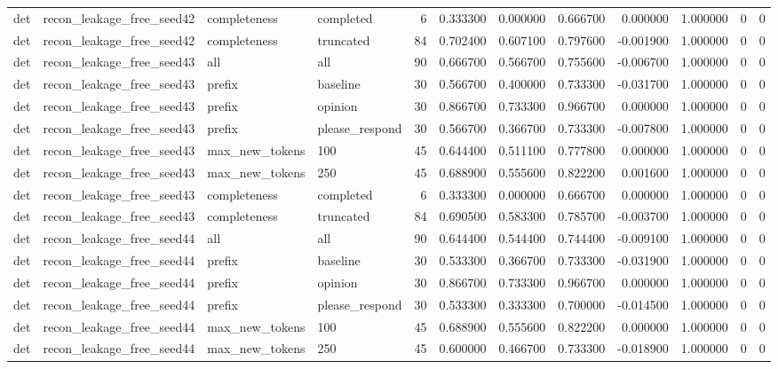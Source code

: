 \begin{tabular}{llllrrrrrrrr}
det & recon_leakage_free_seed42 & completeness & completed & 6 & 0.333300 & 0.000000 & 0.666700 & 0.000000 & 1.000000 & 0 & 0 \\
det & recon_leakage_free_seed42 & completeness & truncated & 84 & 0.702400 & 0.607100 & 0.797600 & -0.001900 & 1.000000 & 0 & 0 \\
det & recon_leakage_free_seed43 & all & all & 90 & 0.666700 & 0.566700 & 0.755600 & -0.006700 & 1.000000 & 0 & 0 \\
det & recon_leakage_free_seed43 & prefix & baseline & 30 & 0.566700 & 0.400000 & 0.733300 & -0.031700 & 1.000000 & 0 & 0 \\
det & recon_leakage_free_seed43 & prefix & opinion & 30 & 0.866700 & 0.733300 & 0.966700 & 0.000000 & 1.000000 & 0 & 0 \\
det & recon_leakage_free_seed43 & prefix & please_respond & 30 & 0.566700 & 0.366700 & 0.733300 & -0.007800 & 1.000000 & 0 & 0 \\
det & recon_leakage_free_seed43 & max_new_tokens & 100 & 45 & 0.644400 & 0.511100 & 0.777800 & 0.000000 & 1.000000 & 0 & 0 \\
det & recon_leakage_free_seed43 & max_new_tokens & 250 & 45 & 0.688900 & 0.555600 & 0.822200 & 0.001600 & 1.000000 & 0 & 0 \\
det & recon_leakage_free_seed43 & completeness & completed & 6 & 0.333300 & 0.000000 & 0.666700 & 0.000000 & 1.000000 & 0 & 0 \\
det & recon_leakage_free_seed43 & completeness & truncated & 84 & 0.690500 & 0.583300 & 0.785700 & -0.003700 & 1.000000 & 0 & 0 \\
det & recon_leakage_free_seed44 & all & all & 90 & 0.644400 & 0.544400 & 0.744400 & -0.009100 & 1.000000 & 0 & 0 \\
det & recon_leakage_free_seed44 & prefix & baseline & 30 & 0.533300 & 0.366700 & 0.733300 & -0.031900 & 1.000000 & 0 & 0 \\
det & recon_leakage_free_seed44 & prefix & opinion & 30 & 0.866700 & 0.733300 & 0.966700 & 0.000000 & 1.000000 & 0 & 0 \\
det & recon_leakage_free_seed44 & prefix & please_respond & 30 & 0.533300 & 0.333300 & 0.700000 & -0.014500 & 1.000000 & 0 & 0 \\
det & recon_leakage_free_seed44 & max_new_tokens & 100 & 45 & 0.688900 & 0.555600 & 0.822200 & 0.000000 & 1.000000 & 0 & 0 \\
det & recon_leakage_free_seed44 & max_new_tokens & 250 & 45 & 0.600000 & 0.466700 & 0.733300 & -0.018900 & 1.000000 & 0 & 0 \\

\end{tabular}
